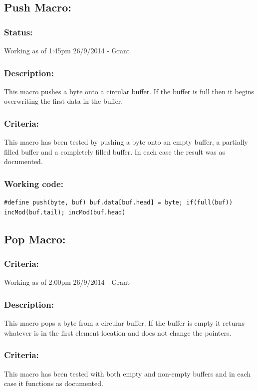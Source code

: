 \documentclass[]{report}
\begin{document}
\subsection{Push Macro:}
\subsubsection{Status:}
Working as of 1:45pm 26/9/2014 - Grant

\subsubsection{Description:}
This macro pushes a byte onto a circular buffer. If the buffer is full then it begins overwriting the first data in the buffer.

\subsubsection{Criteria:}
This macro has been tested by pushing a byte onto an empty buffer, a partially filled buffer and a completely filled buffer. In each case the result was as documented.

\subsubsection{Working code:}
\begin{lstlisting}
#define push(byte, buf) buf.data[buf.head] = byte; if(full(buf)) incMod(buf.tail); incMod(buf.head)
\end{lstlisting}

\subsection{Pop Macro:}
\subsubsection{Criteria:}
Working as of 2:00pm 26/9/2014 - Grant

\subsubsection{Description:}
This macro pops a byte from a circular buffer. If the buffer is empty it returns whatever is in the first element location and does not change the pointers.

\subsubsection{Criteria:}
This macro has been tested with both empty and non-empty buffers and in each case it functions as documented.
\end{document}
